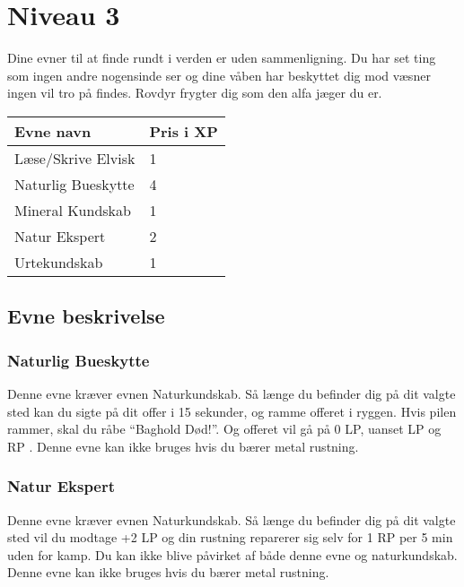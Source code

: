 \chapter*{Niveau 3}

Dine evner til at finde rundt i verden er uden sammenligning. Du har set ting som ingen andre nogensinde ser og dine våben har beskyttet dig mod væsner ingen vil tro på findes. Rovdyr frygter dig som den alfa jæger du er.

\begin{table}[H]
    \centering
    \begin{tabular}{|p{}|p{}|}
    \rowcolor{cerulean!80}\hline
        Evne navn & Pris i XP \\\hline
        Læse/Skrive Elvisk & 1\\\hline
        Naturlig Bueskytte & 4\\\hline
        Mineral Kundskab & 1\\\hline
        Natur Ekspert & 2\\\hline
        Urtekundskab & 1\\\hline
    \end{tabular}
\end{table}
\section*{Evne beskrivelse}



\subsection*{Naturlig Bueskytte}
Denne evne kræver evnen Naturkundskab. Så længe du befinder dig på dit valgte sted kan du sigte på dit offer i 15 sekunder, og ramme offeret i ryggen. Hvis pilen rammer, skal du råbe “Baghold Død!”. Og offeret vil gå på 0 LP, uanset LP og RP . Denne evne kan ikke bruges hvis du bærer metal rustning.



\subsection*{Natur Ekspert}
Denne evne kræver evnen Naturkundskab. Så længe du befinder dig på dit valgte sted vil du modtage +2 LP og din rustning reparerer sig selv for 1 RP per 5 min uden for kamp. Du kan ikke blive påvirket af både denne evne og naturkundskab. Denne evne kan ikke bruges hvis du bærer metal rustning.


